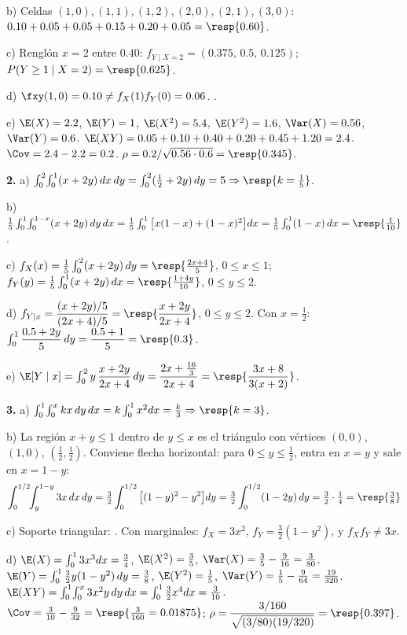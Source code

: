 b) Celdas $(1,0),(1,1),(1,2),(2,0),(2,1),(3,0)$: $0.10+0.05+0.05+0.15+0.20+0.05=\resp{0.60}$.

c) Rengl\'on $x=2$ entre $0.40$: $f_{Y\mid X=2}=(0.375,\,0.5,\,0.125)$; $P(Y\ge1\mid X=2)=\resp{0.625}$.

d) $\fxy(1,0)=0.10\ne f_X(1)f_Y(0)=0.06$. .

e) $\E(X)=2.2$, $\E(Y)=1$, $\E(X^2)=5.4$, $\E(Y^2)=1.6$, $\Var(X)=0.56$, $\Var(Y)=0.6$.
$\E(XY)=0.05+0.10+0.40+0.20+0.45+1.20=2.4$. $\Cov=2.4-2.2=0.2$.
$\rho=0.2/\sqrt{0.56\cdot0.6}=\resp{0.345}$.

\textbf{2.} a) $\int_0^2\!\int_0^1(x+2y)\,dx\,dy=\int_0^2(\tfrac12+2y)\,dy=5\Rightarrow\resp{k=\tfrac15}$.

b) $\tfrac15\int_0^1\!\int_0^{1-x}(x+2y)\,dy\,dx=\tfrac15\int_0^1\big[x(1-x)+(1-x)^2\big]dx=\tfrac15\int_0^1(1-x)\,dx=\resp{\tfrac1{10}}$.

c) $f_X(x)=\tfrac15\int_0^2(x+2y)\,dy=\resp{\tfrac{2x+4}{5}}$, $0\le x\le1$;\quad
$f_Y(y)=\tfrac15\int_0^1(x+2y)\,dx=\resp{\tfrac{1+4y}{10}}$, $0\le y\le2$.

d) $f_{Y\mid x}=\dfrac{(x+2y)/5}{(2x+4)/5}=\resp{\dfrac{x+2y}{2x+4}}$, $0\le y\le2$.
Con $x=\tfrac12$: $\int_0^1\dfrac{0.5+2y}{5}\,dy=\dfrac{0.5+1}{5}=\resp{0.3}$.

e) $\E[Y\mid x]=\int_0^2y\,\dfrac{x+2y}{2x+4}\,dy=\dfrac{2x+\frac{16}{3}}{2x+4}=\resp{\dfrac{3x+8}{3(x+2)}}$.

\textbf{3.} a) $\int_0^1\!\int_0^xkx\,dy\,dx=k\int_0^1x^2dx=\tfrac k3\Rightarrow\resp{k=3}$.

b) La regi\'on $x+y\le1$ dentro de $y\le x$ es el tri\'angulo con v\'ertices $(0,0)$, $(1,0)$, $(\tfrac12,\tfrac12)$. Conviene flecha horizontal:
para $0\le y\le\tfrac12$, entra en $x=y$ y sale en $x=1-y$:
\[\int_0^{1/2}\!\!\int_y^{1-y}3x\,dx\,dy=\tfrac32\int_0^{1/2}\big[(1-y)^2-y^2\big]dy=\tfrac32\int_0^{1/2}(1-2y)\,dy=\tfrac32\cdot\tfrac14=\resp{\tfrac38}\]

c) Soporte triangular: . Con marginales: $f_X=3x^2$, $f_Y=\tfrac32(1-y^2)$, y $f_Xf_Y\ne3x$.

d) $\E(X)=\int_0^13x^3dx=\tfrac34$, $\E(X^2)=\tfrac35$, $\Var(X)=\tfrac35-\tfrac9{16}=\tfrac3{80}$.
$\E(Y)=\int_0^1\tfrac32y(1-y^2)\,dy=\tfrac38$, $\E(Y^2)=\tfrac15$, $\Var(Y)=\tfrac15-\tfrac9{64}=\tfrac{19}{320}$.
$\E(XY)=\int_0^1\!\int_0^x3x^2y\,dy\,dx=\int_0^1\tfrac32x^4dx=\tfrac3{10}$.
$\Cov=\tfrac3{10}-\tfrac9{32}=\resp{\tfrac3{160}=0.01875}$;\quad
$\rho=\dfrac{3/160}{\sqrt{(3/80)(19/320)}}=\resp{0.397}$.

